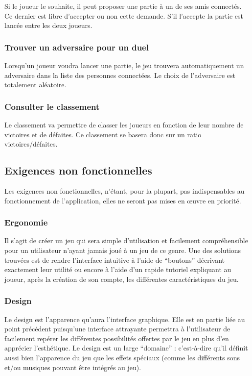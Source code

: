\documentclass[11pt,a4paper]{article}
\begin{document}
Si le joueur le souhaite, il peut proposer une partie à un de ses
amis connectés. Ce dernier est libre d'accepter ou non cette demande.
S'il l'accepte la partie est lancée entre les deux joueurs.


\subsubsection*{Trouver un adversaire pour un duel}

Lorsqu'un joueur voudra lancer une partie, le jeu trouvera
automatiquement un adversaire dans la liste des personnes
connectées. Le choix de l'adversaire est totalement aléatoire.


\subsubsection*{Consulter le classement}

Le classement va permettre de classer les joueurs en fonction de
leur nombre de victoires et de défaites. Ce classement se
basera donc sur un ratio victoires/défaites.


\subsection{Exigences non fonctionnelles}
\label{sec:exi-nonfonc}

Les exigences non fonctionnelles, n'étant, pour la plupart, pas indispensables au fonctionnement de l'application, elles ne seront pas mises en œuvre en priorité.


\subsubsection*{Ergonomie}
Il s'agit de créer un jeu qui sera simple d'utilisation et facilement compréhensible pour un utilisateur n'ayant jamais joué à un jeu de ce genre.
\medbreak
Une des solutions trouvées est de rendre l'interface intuitive à l'aide de ``boutons'' décrivant exactement leur utilité ou encore à l'aide d'un rapide tutoriel expliquant au joueur, après la création de son compte, les différentes caractéristiques du jeu.


\subsubsection*{Design}
Le design est l'apparence qu'aura l'interface graphique. Elle est en partie liée au point précédent puisqu'une interface attrayante permettra à l'utilisateur de facilement repérer les différentes possibilités offertes par le jeu en plus d'en apprécier l'esthétique.
\medbreak
Le design est un large ``domaine'' : c'est-à-dire qu'il définit aussi bien l'apparence du jeu  que les effets spéciaux (comme les différents sons et/ou musiques pouvant être intégrés au jeu).
\end{document}
